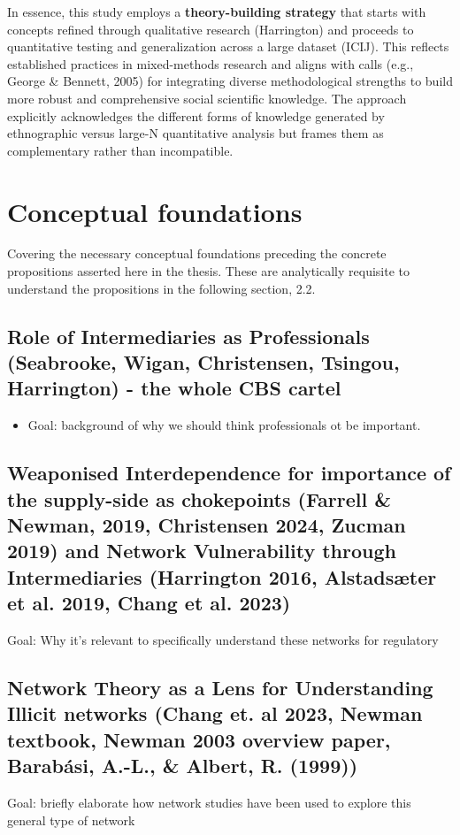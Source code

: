 In essence, this study employs a \textbf{theory-building strategy} that starts with concepts refined through qualitative research (Harrington) and proceeds to quantitative testing and generalization across a large dataset (ICIJ). This reflects established practices in mixed-methods research and aligns with calls (e.g., George \& Bennett, 2005) for integrating diverse methodological strengths to build more robust and comprehensive social scientific knowledge. The approach explicitly acknowledges the different forms of knowledge generated by ethnographic versus large-N quantitative analysis but frames them as complementary rather than incompatible.

\section{Conceptual foundations}
\label{sec:2_1}
Covering the necessary conceptual foundations preceding the concrete propositions asserted here in the thesis. These are analytically requisite to understand the propositions in the following section, 2.2.

\subsection{Role of Intermediaries as Professionals (Seabrooke, Wigan, Christensen, Tsingou, Harrington) - the whole CBS cartel}
\label{subsec:2_1_1}
\begin{itemize}[leftmargin=*]
    \item Goal: background of why we should think professionals ot be important.
\end{itemize}

\subsection{Weaponised Interdependence for importance of the supply-side as chokepoints (Farrell \& Newman, 2019, Christensen 2024, Zucman 2019) and Network Vulnerability through Intermediaries (Harrington 2016, Alstadsæter et al. 2019, Chang et al. 2023)}
\label{subsec:2_1_2}
Goal: Why it's relevant to specifically understand these networks for regulatory

\subsection{Network Theory as a Lens for Understanding Illicit networks (Chang et. al 2023, Newman textbook, Newman 2003 overview paper, Barabási, A.-L., \& Albert, R. (1999))}
\label{subsec:2_1_3}
Goal: briefly elaborate how network studies have been used to explore this general type of network


